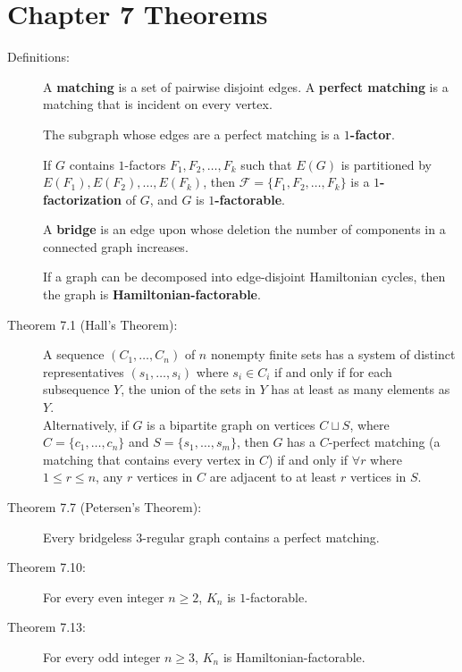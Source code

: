 \documentclass[9pt]{extarticle}
\begin{document}
  \section*{Chapter 7 Theorems}%
  \begin{description}
    \item[Definitions:] A \textbf{matching} is a set of pairwise disjoint edges. A \textbf{perfect matching} is a matching that is incident on every vertex.

      The subgraph whose edges are a perfect matching is a $1$\textbf{-factor}.

      If $G$ contains $1$-factors $F_1,F_2,\dots,F_k$ such that $E(G)$ is partitioned by $E(F_1),E(F_2),\dots,E(F_k)$, then $\mathcal{F} = \{F_1,F_2,\dots,F_k\}$ is a $1$\textbf{-factorization} of $G$, and $G$ is $1$\textbf{-factorable}.

      A \textbf{bridge} is an edge upon whose deletion the number of components in a connected graph increases.

      If a graph can be decomposed into edge-disjoint Hamiltonian cycles, then the graph is \textbf{Hamiltonian-factorable}.
    \item[Theorem 7.1 (Hall's Theorem):] A sequence $(C_1,\dots,C_n)$ of $n$ nonempty finite sets has a system of distinct representatives $(s_1,\dots,s_i)$ where $s_i\in C_i$ if and only if for each subsequence $Y$, the union of the sets in $Y$ has at least as many elements as $Y$.\\

      Alternatively, if $G$ is a bipartite graph on vertices $C\sqcup S$, where $C = \{c_1,\dots,c_n\}$ and $S = \{s_1,\dots,s_m\}$, then $G$ has a $C$-perfect matching (a matching that contains every vertex in $C$) if and only if $\forall r$ where $1 \leq r \leq n$, any $r$ vertices in $C$ are adjacent to at least $r$ vertices in $S$.
    \item[Theorem 7.7 (Petersen's Theorem):] Every bridgeless $3$-regular graph contains a perfect matching.
    \item[Theorem 7.10:] For every even integer $n\geq 2$, $K_n$ is $1$-factorable.
    \item[Theorem 7.13:] For every odd integer $n\geq 3$, $K_n$ is Hamiltonian-factorable.
  \end{description}
\end{document}
